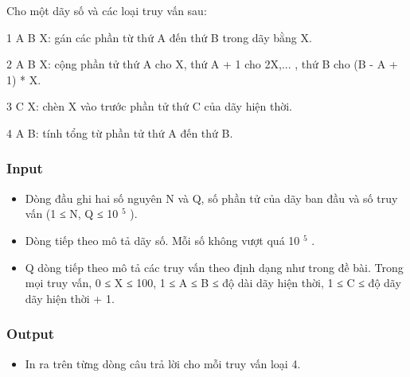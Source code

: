 



   Cho một dãy số và các loại truy vấn sau:  

   1 A B X: gán các phần từ thứ A đến thứ B trong dãy bằng X.  

   2 A B X: cộng phần tử thứ A cho X, thứ A + 1 cho 2X,... , thứ B cho (B - A + 1) * X.  

   3 C X: chèn X vào trước phần tử thứ C của dãy hiện thời.  

   4 A B: tính tổng từ phần tử thứ A đến thứ B.  

\subsubsection{   Input  }
\begin{itemize}
	\item     Dòng đầu ghi hai số nguyên N và Q, số phần tử của dãy ban đầu và số truy vấn (1 ≤ N, Q ≤ 10    $^     5    $    ).   
	\item     Dòng tiếp theo mô tả dãy số. Mỗi số không vượt quá 10    $^     5    $    .   
	\item     Q dòng tiếp theo mô tả các truy vấn theo định dạng như trong đề bài. Trong mọi truy vấn, 0 ≤ X ≤ 100, 1 ≤ A ≤ B ≤ độ dài dãy hiện thời, 1 ≤ C ≤ độ dãy dãy hiện thời + 1.   
\end{itemize}

\subsubsection{   Output  }
\begin{itemize}
	\item     In ra trên từng dòng câu trả lời cho mỗi truy vấn loại 4.   
\end{itemize}

